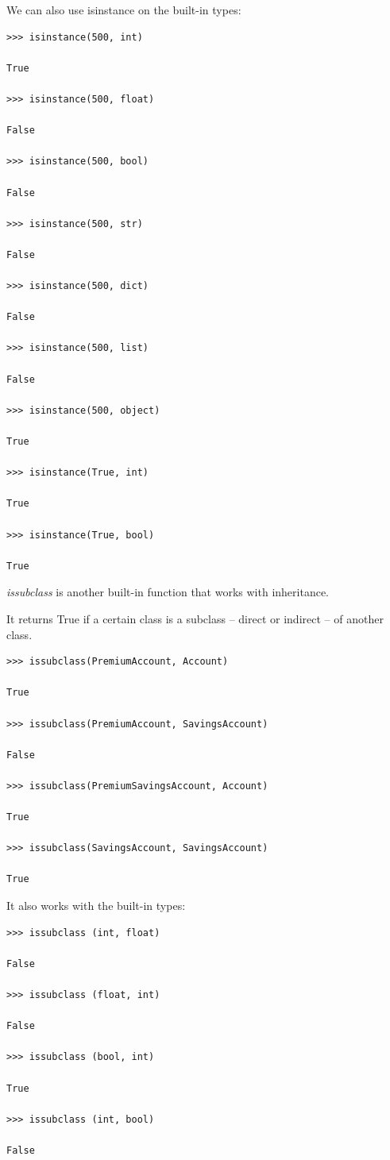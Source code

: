 \documentclass{article}
\begin{document}
We can also use isinstance on the built-in types:

\begin{lstlisting}
>>> isinstance(500, int)

True

>>> isinstance(500, float)

False

>>> isinstance(500, bool)

False

>>> isinstance(500, str)

False

>>> isinstance(500, dict)

False

>>> isinstance(500, list)

False

>>> isinstance(500, object)

True

>>> isinstance(True, int)

True

>>> isinstance(True, bool)

True
\end{lstlisting}
 
\textit{issubclass} is another built-in function that works with inheritance.  

It returns True if a certain class is a subclass – direct or indirect – of another class.

\begin{lstlisting}
>>> issubclass(PremiumAccount, Account)

True

>>> issubclass(PremiumAccount, SavingsAccount)

False

>>> issubclass(PremiumSavingsAccount, Account)

True

>>> issubclass(SavingsAccount, SavingsAccount)

True
\end{lstlisting}

It also works with the built-in types:

\begin{lstlisting}
>>> issubclass (int, float)

False

>>> issubclass (float, int)

False

>>> issubclass (bool, int)

True

>>> issubclass (int, bool)

False
\end{lstlisting}
\end{document}
